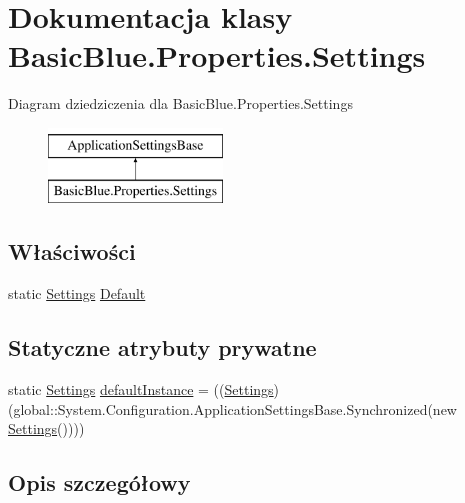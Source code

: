 \hypertarget{class_basic_blue_1_1_properties_1_1_settings}{\section{Dokumentacja klasy Basic\-Blue.\-Properties.\-Settings}
\label{class_basic_blue_1_1_properties_1_1_settings}
}
Diagram dziedziczenia dla Basic\-Blue.\-Properties.\-Settings\begin{figure}[H]
\begin{center}
\leavevmode
\includegraphics[height=2.000000cm]{class_basic_blue_1_1_properties_1_1_settings}
\end{center}
\end{figure}
\subsection*{Właściwości}
\begin{DoxyCompactItemize}
\item 
static \hyperlink{class_basic_blue_1_1_properties_1_1_settings}{Settings} \hyperlink{class_basic_blue_1_1_properties_1_1_settings_a89730c8b364a4219d8202678a59dd719}{Default}
\end{DoxyCompactItemize}
\subsection*{Statyczne atrybuty prywatne}
\begin{DoxyCompactItemize}
\item 
static \hyperlink{class_basic_blue_1_1_properties_1_1_settings}{Settings} \hyperlink{class_basic_blue_1_1_properties_1_1_settings_ac329771b6b59763541b72b168fe36313}{default\-Instance} = ((\hyperlink{class_basic_blue_1_1_properties_1_1_settings}{Settings})(global\-::\-System.\-Configuration.\-Application\-Settings\-Base.\-Synchronized(new \hyperlink{class_basic_blue_1_1_properties_1_1_settings}{Settings}())))
\end{DoxyCompactItemize}


\subsection{Opis szczegółowy}



